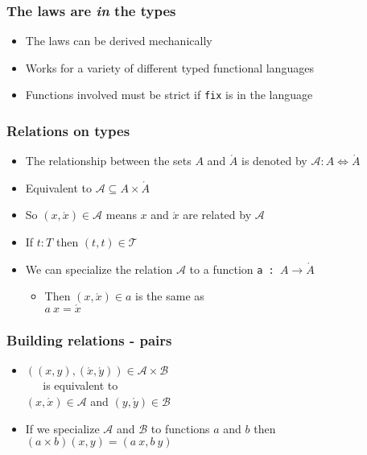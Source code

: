 \documentclass{beamer}
\begin{document}
\begin{frame}[fragile]
    \frametitle{The laws are \textit{in} the types}
\begin{itemize}
    \item The laws can be derived mechanically
    \item Works for a variety of different typed functional languages
    \item Functions involved must be strict if \verb?fix? is in the language
\end{itemize}
\end{frame}

\begin{frame}[fragile]
    \frametitle{Relations on types}

\begin{itemize}
    \item The relationship between the sets $A$ and $\acute{A}$ is denoted by $\mathcal{A} : A \Leftrightarrow \acute{A}$
    \item Equivalent to $\mathcal{A} \subseteq A \times \acute{A}$
    \item So $(x, \acute{x}) \in \mathcal{A}$ means $x$ and $\acute{x}$ are related by $\mathcal{A}$ 
    \item If $t : T$ then $(t, t) \in \mathcal{T}$
    \item We can specialize the relation $\mathcal{A}$ to a function \verb?a : ?$A \rightarrow \acute{A}$
        \begin{itemize}
            \item Then $(x, \acute{x}) \in a$ is the same as \\
                $a\ x = \acute{x}$
        \end{itemize}
\end{itemize}

\end{frame}

\begin{frame}[fragile]
    \frametitle{Building relations - pairs}

\begin{itemize}
    \item 
        $((x,y),(\acute{x},\acute{y})) \in \mathcal{A} \times \mathcal{B}$ \\
        \verb?   ?is equivalent to \\
        $(x,\acute{x}) \in \mathcal{A}$ and $(y, \acute{y}) \in \mathcal{B}$
    \item If we specialize $\mathcal{A}$ and $\mathcal{B}$ to functions $a$ and $b$ then \\
        $(a \times b)(x, y) = (a\ x, b\ y)$
\end{itemize}

\end{frame}
\end{document}
